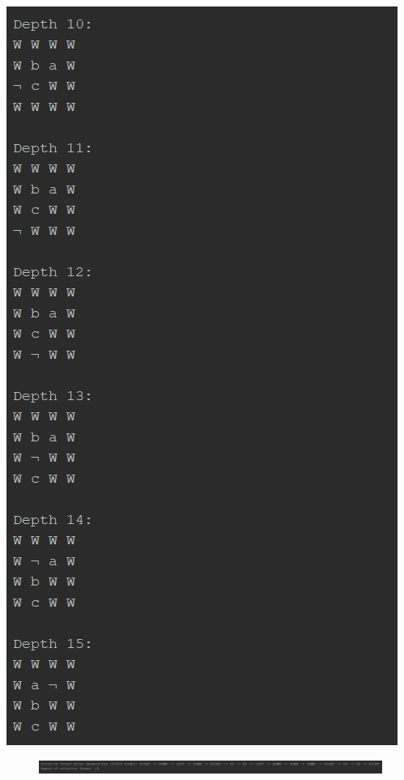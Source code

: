 \documentclass{article}
\begin{document}
\begin{multicols}{2}[\columnsep=2cm]
		\columnbreak
		\includegraphics[height=0.8\textheight,keepaspectratio]{AStar-2-5-2.png}
	\end{multicols}

	\begin{figure}[h]
		\centering
		\includegraphics[width=\textwidth,keepaspectratio]{AStar-2-6.png}
	\end{figure}
	
\end{document}
